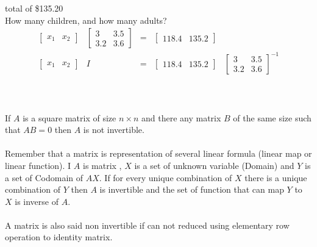 \documentclass[a4paper, 12pt]{article}
\begin{document}
total of \$135.20\\
How many children, and how many adults?
\[
{\begin{array}{ccccc}
\left[{\begin{array}{cc}
x_1 & x_2
\end{array}
}
\right] &
\left[{\begin{array}{cc}
3 & 3.5  \\
3.2 & 3.6
\end{array}
}
\right] &
=       &
\left[{\begin{array}{cc}
118.4 & 135.2
\end{array}
}
\right] &
\\
\left[{\begin{array}{cc}
x_1 & x_2
\end{array}
}
\right]  &
I &
= &
\left[{\begin{array}{cc}
118.4 & 135.2
\end{array}
}
\right] &
\left[{\begin{array}{cc}
3 & 3.5  \\
3.2 & 3.6
\end{array}
}
\right] ^{-1} 
\end{array}}
\] 
\\
\\
\\
If $A$ is a square matrix of size $n \times n$ and there any matrix $B$ of the same size such that  
$A B = 0$ then $A$ is not invertible.
\\
\\
Remember that a matrix is representation of several linear formula (linear map or linear function).
I $A$ is matrix , $X$ is a set of unknown variable (Domain) and $Y$ is a set of Codomain of
$AX$. If for every unique combination of $X$ there is a unique combination of $Y$ then $A$
is invertible and the set of function that can map $Y$ to $X$ is inverse of $A$.
\\
\\
A matrix is also said non invertible if can not reduced using elementary row operation to identity matrix.
\\
\end{document}
